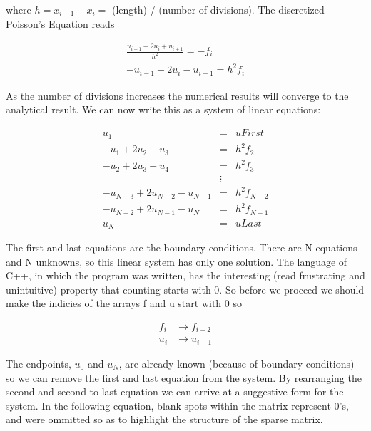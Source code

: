 \documentclass{article}
\begin{document}
where $h = x_{i+1} - x_i = $ (length) / (number of divisions).  The discretized Poisson’s Equation reads

\begin{equation}
\begin{aligned}
	\frac{u_{i-1} - 2 u_i + u_{i+1}}{h^2} = - f_i \\
	- u_{i-1} + 2 u_i - u_{i+1} = h^2 f_i
\end{aligned}
\end{equation}

As the number of divisions increases the numerical results will converge to the analytical result.  We can now write this as a system of linear equations:

\begin{equation} 
\begin{aligned}
                            u_1 &=& uFirst      \\
            - u_1 + 2 u_2 - u_3 &=& h^2 f_2     \\
            - u_2 + 2 u_3 - u_4 &=& h^2 f_3     \\
                             &\vdots &          \\
- u_{N-3} + 2 u_{N-2} - u_{N-1} &=& h^2 f_{N-2} \\
    - u_{N-2} + 2 u_{N-1} - u_N &=& h^2 f_{N-1} \\
                            u_N &=& uLast
\end{aligned} 
\end{equation}

The first and last equations are the boundary conditions.  There are N equations and N unknowns, so this linear system has only one solution.  The language of C++, in which the program was written, has the interesting (read frustrating and unintuitive) property that counting starts with 0.  So before we proceed we should make the indicies of the arrays f and u start with 0 so

\begin{equation}
\begin{aligned}
	f_i &\to f_{i-2} \\
	u_i &\to u_{i-1}
\end{aligned}
\end{equation}


The endpoints, $u_0$ and $u_N$, are already known (because of boundary conditions) so we can remove the first and last equation from the system.  By rearranging the second and second to last equation we can arrive at a suggestive form for the system.  In the following equation, blank spots within the matrix represent 0's, and were ommitted so as to highlight the structure of the sparse matrix.
\end{document}
